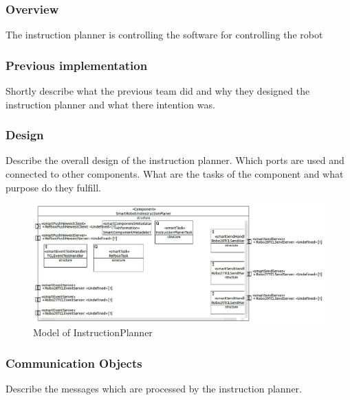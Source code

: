 \subsubsection{Overview}

The instruction planner is controlling the software for 
controlling the robot \\

\subsubsection{Previous implementation}
Shortly describe what the previous team did and why they designed the instruction planner and what 
there intention was. 

\subsubsection{Design}

Describe the overall design of the instruction planner. Which ports are used and connected to other components. What are the tasks of the component and what purpose do they fulfill. 

\begin{figure}[h]
\centering
\includegraphics[scale=0.25]{pic/SmartRobotinoInstructionPlaner.JPG}
\caption{Model of InstructionPlanner}
\end{figure}


\subsubsection{Communication Objects}

Describe the messages which are processed by the instruction planner. 

